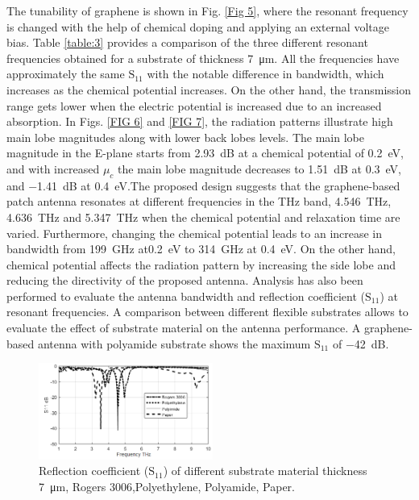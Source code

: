 \documentclass[12pt]{suhbook}
\begin{document}
The tunability of graphene is shown in Fig. \ref{Fig 5}, where the resonant frequency is changed with the help of chemical doping and applying an external voltage bias. Table \ref{table:3} provides a comparison of the three different resonant frequencies obtained for a substrate of thickness \SI{7}{\um}. All the frequencies have approximately the same $\mathrm{S_{11}}$ with the notable difference in bandwidth, which increases as the chemical potential increases. On the other hand, the transmission range gets lower when the electric potential is increased due to an increased absorption. In Figs. \ref{FIG 6} and \ref{FIG 7}, the radiation patterns illustrate high main lobe magnitudes along with lower back lobes levels. The main lobe magnitude in the E-plane starts from \SI{2.93}{\dB} at a chemical potential of \SI{0.2}{\eV}, and with increased $\mu_c$ the main lobe magnitude decreases to \SI{1.51}{\dB} at \SI{0.3}{\eV}, and \SI{-1.41}{\dB} at \SI{0.4}{\eV}.The proposed design suggests that the graphene-based patch antenna resonates at different frequencies in the THz band, \SI{4.546}{\THz}, \SI{4.636}{\THz} and \SI{5.347}{\THz} when the chemical potential and relaxation time are varied. Furthermore, changing the chemical potential leads to an increase in bandwidth from \SI{199}{\GHz} at\SI{0.2}{\eV} to \SI{314}{\GHz} at \SI{0.4}{\eV}. On the other hand, chemical potential affects the radiation pattern by increasing the side lobe and reducing the directivity of the proposed antenna. Analysis has also been performed to evaluate the antenna bandwidth and reflection coefficient ($\mathrm{S_{11}}$) at resonant frequencies. A comparison between different flexible substrates allows to evaluate the effect of substrate material on the antenna performance. A graphene-based antenna with polyamide substrate shows the maximum $\mathrm{S_{11}}$ of \SI{-42}{\dB}.
% 
\begin{figure}[hbt!]
\centering
\includegraphics[width=0.51\textwidth]{4}
\caption{Reflection coefficient ($\mathrm{S_{11}}$) of different substrate material thickness \SI{7}{\um},  Rogers 3006,Polyethylene, Polyamide, Paper.}
\label{Fig 4}
\end{figure}
\end{document}
